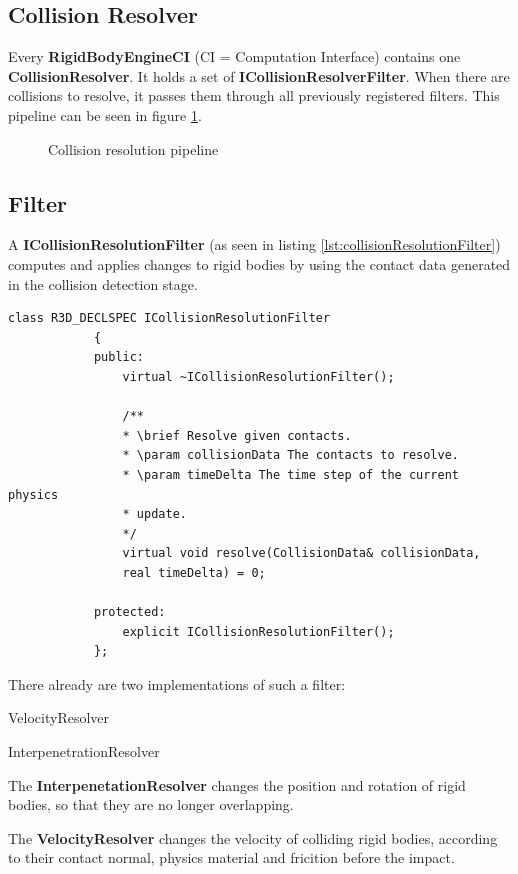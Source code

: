 \documentclass[12p, paper=a4, leqno, colorinlistoftodos]{article}
\newenvironment{packed_itemize}
{\begin{itemize}
		\setlength{\itemsep}{0pt}
		\setlength{\parskip}{0pt}
		\setlength{\parsep}{0pt}
	}{\end{itemize}}
\begin{document}
		\subsection{Collision Resolver}
		Every \textbf{RigidBodyEngineCI} (CI = Computation Interface) contains one \textbf{CollisionResolver}. It holds a set of \textbf{ICollisionResolverFilter}. When there are collisions to resolve, it passes them through all previously registered filters. This pipeline can be seen in figure \ref{fig:collisionResolutionPipeline}.
		 
		\begin{figure}[H]
			\centering
			\caption{Collision resolution pipeline}
			\label{fig:collisionResolutionPipeline}
		\end{figure}
		 
		\subsection{Filter}
		A \textbf{ICollisionResolutionFilter} (as seen in listing \ref{lst:collisionResolutionFilter}) computes and applies changes to rigid bodies by using the contact data generated in the collision detection stage. 
		\begin{lstlisting}[caption={Collision resolution filter},captionpos=b, label=lst:collisionResolutionFilter]
			class R3D_DECLSPEC ICollisionResolutionFilter
			{
			public:
				virtual ~ICollisionResolutionFilter();
				
				/**
				* \brief Resolve given contacts.
				* \param collisionData The contacts to resolve.
				* \param timeDelta The time step of the current physics
				* update.
				*/
				virtual void resolve(CollisionData& collisionData,
				real timeDelta) = 0;
				
			protected:
				explicit ICollisionResolutionFilter();
			};
		\end{lstlisting}
		There already are two implementations of such a filter:
		\begin{packed_itemize}
			\item VelocityResolver
			\item InterpenetrationResolver
		\end{packed_itemize}
		The \textbf{InterpenetationResolver} changes the position and rotation of rigid bodies, so that they are no longer overlapping.
		
		The \textbf{VelocityResolver} changes the velocity of colliding rigid bodies, according to their contact normal, physics material and fricition before the impact.
		
		
		
	
	
	
	
	
	
	
	
\end{document}
